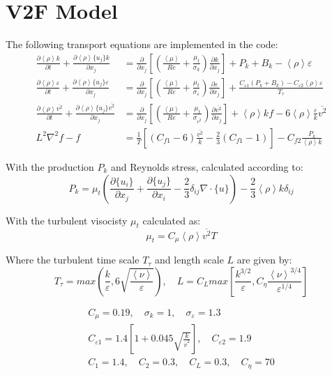 \documentclass[paper=a4, fontsize=12pt]{scrartcl} %
\newcommand{\rave}[1]{\left<{#1}\right>}
\newcommand{\fave}[1]{\{{#1}\}}
\newcommand{\pd}{\partial }
\newcommand{\fpd}[2]{\frac{\partial #1}{\partial {#2}}}
\begin{document}
\section{V2F Model}
The following transport equations are implemented in the code:
\begin{equation} \label{eq:ktDeng}
\begin{split}
\fpd{\rave{\rho} k }{t} + \fpd{\rave{\rho}\fave{u_j}k}{x_j} &= \frac{\pd}{\pd x_j}\left[\left(\frac{\rave{\mu}}{Re} + \frac{\mu_t}{\sigma_k}\right)\fpd{k}{x_j}\right] + P_{k} + B_k- \rave{\rho}\varepsilon \\
\fpd{\rave{\rho} \varepsilon}{t} + \fpd{\rave{\rho} \fave{u_j} \varepsilon}{x_j} &= \frac{\pd}{\pd x_j}\left[ \left(\frac{\rave{\mu}}{Re} + \frac{\mu_t}{\sigma_{\varepsilon}}\right)\fpd {\varepsilon}{x_j}\right] + \frac{C_{\varepsilon1}(P_k+B_k)  -C_{\varepsilon2} \rave{\rho} \varepsilon}{T_\tau}   \\
\fpd{ \rave{\rho} \overline{v^2}}{t} + \fpd{ \rave{\rho} \fave{u_j} \overline{v^2}}{x_j}           &= \frac{\pd}{\pd x_j}\left[ \left(\frac{\rave{\mu}}{Re} + \frac{\mu_t}{\sigma_{\overline{v^2}}}\right)\fpd {\overline{v^2}}{x_j}\right] + \rave{\rho} k f - 6\rave{\rho} \frac{\varepsilon}{k}\overline{v^2} \\
L^2\nabla^2 f -f &= \frac{1}{T}\left[(C_{f1}-6)\frac{\overline{v^2}}{k}-\frac{2}{3}(C_{f1}-1)\right]-C_{f2}\frac{P_k}{\rave{\rho} k}
\end{split}
\end{equation}

With the production $P_k$ and Reynolds stress, calculated according to:
\begin{equation}
P_k = \mu_t \left(\fpd{\fave{u_i}}{x_j} +\fpd{\fave{u_j}}{x_i} - \frac{2}{3}\delta_{ij} \nabla \cdot \fave{u} \right) - \frac{2}{3} \rave{\rho} k \delta_{ij}
\end{equation}

With the turbulent visocisty $\mu_t$ calculated as:
\begin{equation}
\mu_t = C_\mu \rave{\rho} \overline{v^2} T
\end{equation}

Where the turbulent time scale $T_\tau$ and length scale $L$ are given by:
\begin{equation}
T_\tau = max\left(\frac{k}{\varepsilon},6\sqrt{\frac{\rave{\nu}}{\varepsilon}}\right), \quad L = C_L max\left[\frac{k^{3/2}}{\varepsilon},C_\eta\frac{\rave{\nu}^{3/4}}{\varepsilon^{1/4}}\right]
\end{equation}

\begin{equation}
\begin{split}
C_\mu = 0.19,\quad  \sigma_k = 1, \quad \sigma_\varepsilon =1.3 \\
C_{\varepsilon1} = 1.4\left[1+0.045\sqrt{\frac{k}{\overline{v}^2}}\right], \quad C_{\varepsilon2} = 1.9 \\
C_1 = 1.4, \quad C_2 = 0.3, \quad C_L=0.3, \quad C_\eta = 70
\end{split}
\end{equation}
\end{document}
